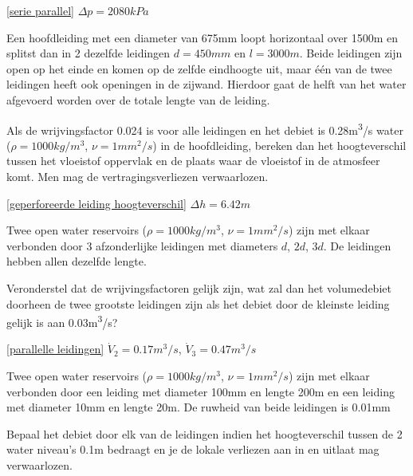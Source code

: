 \begin{antwoord}{\ref{serie parallel}}
	$\Delta p = 2080\unit{kPa}$
\end{antwoord}
\begin{toepassing}
	\label{geperforeerde leiding hoogteverschil}
Een hoofdleiding met een diameter van 675mm loopt horizontaal over 1500m en splitst dan in 2 dezelfde leidingen $d=450\unit{mm}$ en $l=3000\unit{m}$. Beide leidingen zijn open op het einde en komen op de zelfde eindhoogte uit, maar één van de twee leidingen heeft ook openingen in de zijwand. Hierdoor gaat de helft van het water afgevoerd worden over de totale lengte van de leiding.

Als de wrijvingsfactor 0.024 is voor alle leidingen en het debiet is 0.28\unit{m^3/s} water ($\rho=1000\unit{kg/m^3}$, $\nu=1\unit{mm^2/s}$) in de hoofdleiding, bereken dan het hoogteverschil tussen het vloeistof oppervlak en de plaats waar de vloeistof in de atmosfeer komt. Men mag de vertragingsverliezen verwaarlozen.
\end{toepassing}
\begin{antwoord}{\ref{geperforeerde leiding hoogteverschil}}
	$\Delta h = 6.42\unit{m}$
\end{antwoord}
\begin{toepassing}
	\label{parallelle leidingen}
Twee open water reservoirs ($\rho=1000\unit{kg/m^3}$, $\nu=1\unit{mm^2/s}$) zijn met elkaar verbonden door 3 afzonderlijke leidingen met diameters $d$, $2d$, $3d$. De leidingen hebben allen dezelfde lengte.
		
Veronderstel dat de wrijvingsfactoren gelijk zijn, wat zal dan het volumedebiet doorheen de twee grootste leidingen zijn als het debiet door de kleinste leiding gelijk is aan 0.03\unit{m^3/s}? 
\end{toepassing}
\begin{antwoord}{\ref{parallelle leidingen}}
	$\dot{V}_2 = 0.17\unit{m^3/s}$, $\dot{V}_3 = 0.47\unit{m^3/s}$
\end{antwoord}
\begin{toepassing}[*]
	\label{turbulent laminair}
	Twee open water reservoirs ($\rho=1000\unit{kg/m^3}$, $\nu=1\unit{mm^2/s}$) zijn met elkaar verbonden door een leiding met diameter 100mm en lengte 200m en een leiding met diameter 10mm en lengte 20m. De ruwheid van beide leidingen is 0.01mm
	
Bepaal het debiet door elk van de leidingen indien het hoogteverschil tussen de 2 water niveau's 0.1m bedraagt en je de lokale verliezen aan in en uitlaat mag verwaarlozen.
\end{toepassing}
